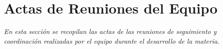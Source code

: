 \section{Actas de Reuniones del Equipo}

\begin{small}
\textit{En esta sección se recopilan las actas de las reuniones de seguimiento y coordinación realizadas por el equipo durante el desarrollo de la materia.}
\end{small}

\vspace{1em}



\newpage %


\newpage


\newpage



